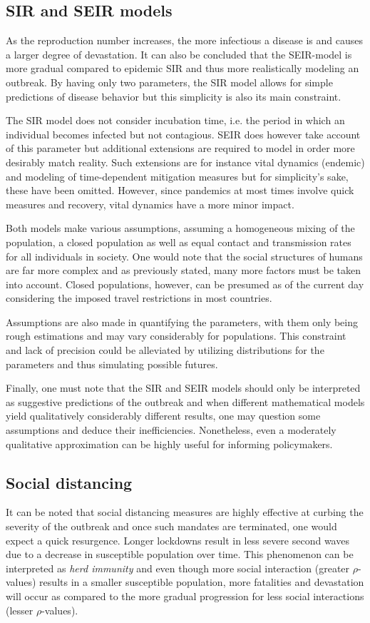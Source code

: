 \documentclass[12pt]{article}
\begin{document}
\subsection{SIR and SEIR models}
As the reproduction number increases, the more infectious a disease 
is and causes a larger degree of devastation. It can also be concluded 
that the SEIR-model is more gradual compared to epidemic SIR and thus 
more realistically modeling an outbreak. By having only two parameters, 
the SIR model allows for simple predictions of disease behavior but 
this simplicity is also its main constraint. 

The SIR model does not consider incubation time, i.e. the period in 
which an individual becomes infected but not contagious. SEIR does 
however take account of this parameter but additional extensions are 
required to model in order more desirably match reality. Such extensions 
are for instance vital dynamics (endemic) and modeling of time-dependent 
mitigation measures but for simplicity's sake, these have been omitted. 
However, since pandemics at most times involve quick measures and recovery, 
vital dynamics have a more minor impact. 

Both models make various assumptions, assuming a homogeneous mixing of 
the population, a closed population as well as equal contact and transmission 
rates for all individuals in society. One would note that the social structures 
of humans are far more complex and as previously stated, many more factors 
must be taken into account. Closed populations, however, can be presumed as 
of the current day considering the imposed travel restrictions in most countries. 

Assumptions are also made in quantifying the parameters, with them only 
being rough estimations and may vary considerably for populations. 
This constraint and lack of precision could be alleviated by utilizing 
distributions for the parameters and thus simulating possible futures.

Finally, one must note that the SIR and SEIR models should only be 
interpreted as suggestive predictions of the outbreak and when different 
mathematical models yield qualitatively considerably different results, 
one may question some assumptions and deduce their inefficiencies. 
Nonetheless, even a moderately qualitative approximation can be 
highly useful for informing policymakers.


\newpage 

\subsection{Social distancing}
It can be noted that social distancing measures are highly effective 
at curbing the severity of the outbreak and once such mandates are terminated, 
one would expect a quick resurgence. Longer lockdowns result in less severe 
second waves due to a decrease in susceptible population over time. This phenomenon 
can be interpreted as \textit{herd immunity} and even though more social 
interaction (greater $\rho$-values) results in a smaller susceptible population, 
more fatalities and devastation will occur as compared to the more gradual 
progression for less social interactions (lesser $\rho$-values).
\end{document}
